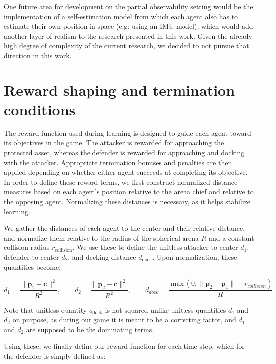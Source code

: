 One future area for development on the partial observability setting would be the implementation of a self-estimation model from which each agent also has to estimate their own position in space (e.g: using an IMU model), which would add another layer of realism to the research presented in this work. Given the already high degree of complexity of the current research, we decided to not pursue that direction in this work.


\section{Reward shaping and termination conditions}
\label{sec:Rewards/Termination}

The reward function used during learning is designed to guide each agent toward its objectives in the game. The attacker is rewarded for approaching the protected asset, whereas the defender is rewarded for approaching and docking with the attacker. Appropriate termination bonuses and penalties are then applied depending on whether either agent succeeds at completing its objective. In order to define these reward terms, we first construct normalized distance measures based on each agent's position relative to the arena chief and relative to the opposing agent. Normalizing these distances is necessary, as it helps stabilize learning.

We gather the distances of each agent to the center and their relative distance, and normalize them relative to the radius of the spherical arena \(R\) and a constant collision radius \(r_{\text{collision}}\). We use these to define the unitless attacker-to-center \(d_1\), defender-to-center \(d_2\), and docking distance \(d_{\text{dock}}\). Upon normalization, these quantities become:

\[
d_1 = \frac{\|\mathbf{p}_1-\mathbf{c}\|^2}{R^2},\qquad
d_2 = \frac{\|\mathbf{p}_2-\mathbf{c}\|^2}{R^2},\qquad
d_{dock} = \frac{\max(0, \|\mathbf{p}_2-\mathbf{p}_1\| - r_{collision})}{R}
\]



Note that unitless quantity $d_{\text{dock}}$ is not squared unlike unitless quantities $d_1$ and $d_2$ on purpose, as during our game it is meant to be a correcting factor, and $d_1$ and $d_2$ are supposed to be the dominating terms. 

Using these, we finally define our reward function for each time step, which for the defender is simply defined as:


